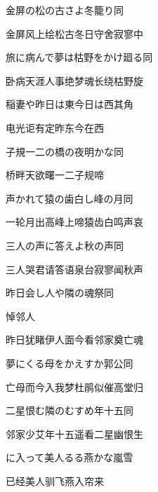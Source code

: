 \begin{haiku}
    {\FH 金屏の松の古さよ冬籠り}\hfill{\FH 同}

    {\FK 金屏风上绘松古冬日守舍寂寥中}
\end{haiku}

\begin{haiku}
    {\FH 旅に病んで夢は枯野をかけ廻る}\hfill{\FH 同}

    {\FK 卧病天涯人事绝梦魂长绕枯野旋}
\end{haiku}

\begin{haiku}
    {\FH 稲妻や昨日は東今日は西}\hfill{\FH 其角}

    {\FK 电光讵有定昨东今在西}
\end{haiku}

\begin{haiku}
    {\FH 子規一二の橋の夜明かな}\hfill{\FH 同}

    {\FK 桥畔天欲曙一二子规啼}
\end{haiku}

\begin{haiku}
    {\FH 声かれて猿の歯白し峰の月}\hfill{\FH 同}

    {\FK 一轮月出高峰上啼猿齿白鸣声哀}
\end{haiku}

\begin{haiku}
    {\FH 三人の声に答えよ秋の声}\hfill{\FH 同}

    {\FK 三人哭君请答语泉台寂寥闻秋声}
\end{haiku}

\begin{haiku}
    {\FH 昨日会し人や隣の魂祭}\hfill{\FH 同}

    {\FK 悼邻人}

    {\FK 昨日犹睹伊人面今看邻家奠亡魂}
\end{haiku}

\begin{haiku}
    {\FH 夢にくる母をかえすか郭公}\hfill{\FH 同}

    {\FK 亡母而今入我梦杜鹃似催高堂归}
\end{haiku}

\begin{haiku}
    {\FH 二星恨む隣のむすめ年十五}\hfill{\FH 同}

    {\FK 邻家少艾年十五遥看二星幽恨生}
\end{haiku}

\begin{haiku}
    {\FH {}に入って美人るる燕かな}\hfill{\FH 嵐雪}

    {\FK 已经美人驯飞燕入帘来}
\end{haiku}

